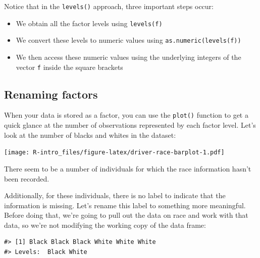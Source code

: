 \documentclass[]{book}
\newenvironment{Shaded}{\begin{snugshade}}{\end{snugshade}}
\newcommand{\KeywordTok}[1]{\textcolor[rgb]{0.13,0.29,0.53}{\textbf{{#1}}}}
\newcommand{\StringTok}[1]{\textcolor[rgb]{0.31,0.60,0.02}{{#1}}}
\newcommand{\NormalTok}[1]{{#1}}
\providecommand{\tightlist}{%
  \setlength{\itemsep}{0pt}\setlength{\parskip}{0pt}}
\theoremstyle{definition}
\theoremstyle{definition}
\theoremstyle{remark}
\begin{document}
Notice that in the \texttt{levels()} approach, three important steps
occur:

\begin{itemize}
\tightlist
\item
  We obtain all the factor levels using \texttt{levels(f)}
\item
  We convert these levels to numeric values using
  \texttt{as.numeric(levels(f))}
\item
  We then access these numeric values using the underlying integers of
  the vector \texttt{f} inside the square brackets
\end{itemize}

\subsection{Renaming factors}\label{renaming-factors}

When your data is stored as a factor, you can use the \texttt{plot()}
function to get a quick glance at the number of observations represented
by each factor level. Let's look at the number of blacks and whites in
the dataset:

\begin{Shaded}
\end{Shaded}

\texttt{[image: R-intro\_files/figure-latex/driver-race-barplot-1.pdf]}

There seem to be a number of individuals for which the race information
hasn't been recorded.

Additionally, for these individuals, there is no label to indicate that
the information is missing. Let's rename this label to something more
meaningful. Before doing that, we're going to pull out the data on race
and work with that data, so we're not modifying the working copy of the
data frame:

\begin{Shaded}
\end{Shaded}

\begin{verbatim}
#> [1] Black Black Black White White White
#> Levels:  Black White
\end{verbatim}
\end{document}
